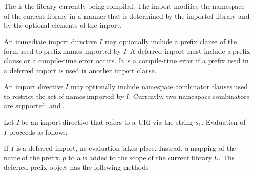 \documentclass[makeidx]{article}
\begin{document}
{

\LMHash{}%
The  is the library currently being compiled.
The import modifies the namespace of the current library in a manner that is determined by the imported library and by the optional elements of the import.

\LMHash{}%
An immediate import directive $I$ may optionally include a prefix clause of the form \code{\AS{} \id} used to prefix names imported by $I$.
A deferred import must include a prefix clause or a compile-time error occurs.
It is a compile-time error if a prefix used in a deferred import is used in another import clause.

\LMHash{}%
An import directive $I$ may optionally include namespace combinator clauses
used to restrict the set of names imported by $I$.
Currently, two namespace combinators are supported: \HIDE{} and \SHOW{}.

\LMHash{}%
Let $I$ be an import directive that refers to a URI via the string $s_1$.
Evaluation of $I$ proceeds as follows:

\LMHash{}%
If $I$ is a deferred import, no evaluation takes place.
Instead, a mapping of the name of the prefix, $p$ to a
 is added to
the scope of the current library $L$.
The deferred prefix object has the following methods:

}
\end{document}

